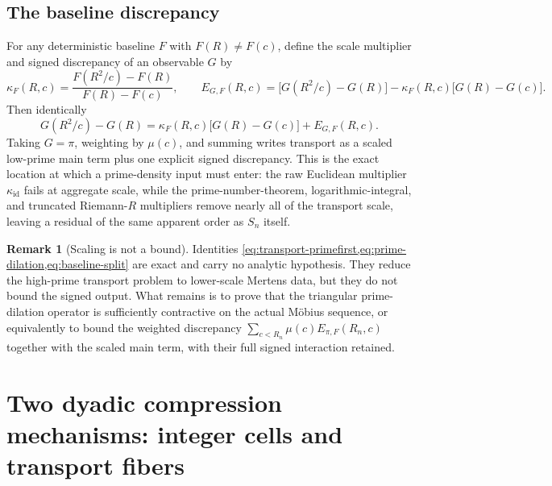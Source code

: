 \documentclass[11pt]{article}
\theoremstyle{definition}
\newtheorem{remark}[theorem]{Remark}
\newcommand{\1}{\mathbf{1}}
\begin{document}
\subsection{The baseline discrepancy}

For any deterministic baseline $F$ with $F(R)\ne F(c)$, define the scale multiplier and signed discrepancy of an observable $G$ by
\begin{equation}
 \kappa_F(R,c)=\frac{F(R^2/c)-F(R)}{F(R)-F(c)},
 \qquad
 E_{G,F}(R,c)=\bigl[G(R^2/c)-G(R)\bigr]-\kappa_F(R,c)\bigl[G(R)-G(c)\bigr].
 \label{eq:baseline-discrepancy}
\end{equation}
Then identically
\begin{equation}
 G(R^2/c)-G(R)=\kappa_F(R,c)\bigl[G(R)-G(c)\bigr]+E_{G,F}(R,c).
 \label{eq:baseline-split}
\end{equation}
Taking $G=\pi$, weighting by $\mu(c)$, and summing writes transport as a scaled low-prime main term plus one explicit signed discrepancy.  This is the exact location at which a prime-density input must enter: the raw Euclidean multiplier $\kappa_{\mathrm{id}}$ fails at aggregate scale, while the prime-number-theorem, logarithmic-integral, and truncated Riemann-$R$ multipliers remove nearly all of the transport scale, leaving a residual of the same apparent order as $S_n$ itself.

\begin{remark}[Scaling is not a bound]
\label{rem:scaling-not-bound}
Identities \cref{eq:transport-primefirst,eq:prime-dilation,eq:baseline-split} are exact and carry no analytic hypothesis.  They reduce the high-prime transport problem to lower-scale Mertens data, but they do not bound the signed output.  What remains is to prove that the triangular prime-dilation operator is sufficiently contractive on the actual M\"obius sequence, or equivalently to bound the weighted discrepancy $\sum_{c<R_n}\mu(c)E_{\pi,F}(R_n,c)$ together with the scaled main term, with their full signed interaction retained.
\end{remark}


\section{Two dyadic compression mechanisms: integer cells and transport fibers}
\label{sec:two-compressions}
\end{document}
